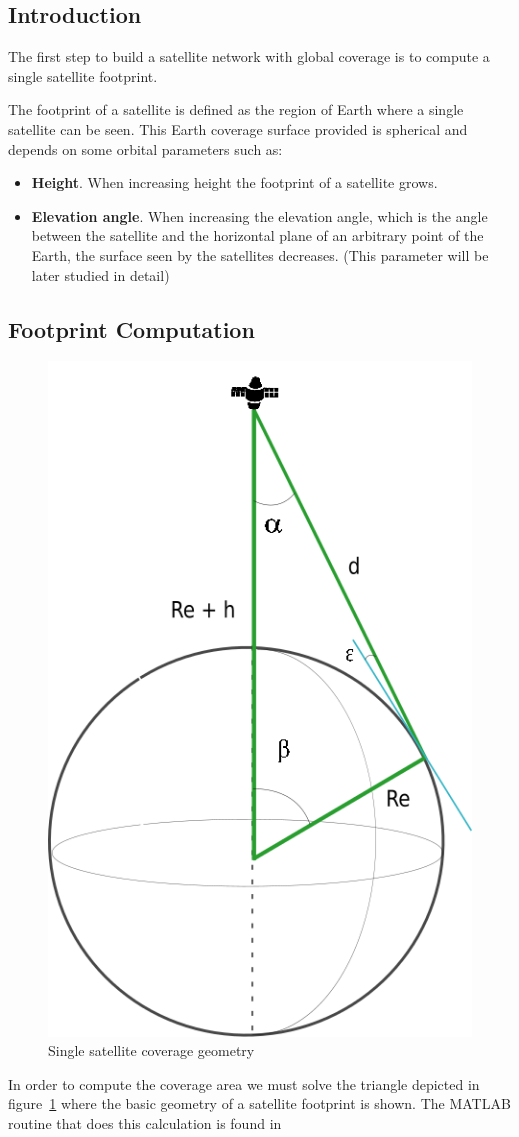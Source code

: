 \subsection{Introduction}

The first step to build a satellite network with global coverage is to compute a single satellite footprint.

The footprint of a satellite is defined as the region of Earth where a single satellite can be seen. This Earth coverage surface provided is spherical and depends on some orbital parameters such as:

\begin{itemize}
\item \textbf{Height}. When increasing height the footprint of a satellite grows.
\item \textbf{Elevation angle}. When increasing the elevation angle, which is the angle between the satellite and the horizontal plane of an arbitrary point of the Earth, the surface seen by the satellites decreases. (This parameter will be later studied in detail)
\end{itemize}

\subsection{Footprint Computation}
 
\begin{figure}[H] %
	\centering
	\includegraphics[width=.3\textwidth]{./fig-Ch2-OrbitalCoverage/AngleSSatFoot.png}
	\caption{Single satellite coverage geometry}
	\label{fig:AngleSSatFoot}
\end{figure}

In order to compute the coverage area we must solve the triangle depicted in figure~\ref{fig:AngleSSatFoot} where the basic geometry of a satellite footprint is shown. The MATLAB routine that does this calculation is found in \cite[Chapter 1, Section 1]{annex6}

